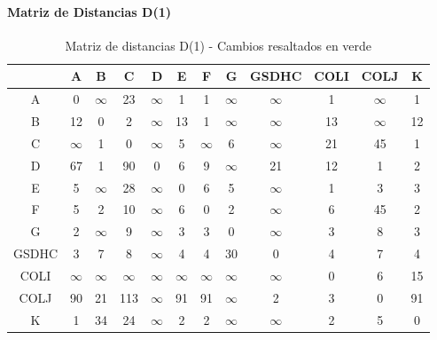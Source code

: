 \documentclass[12pt]{article}
\begin{document}
\paragraph{Matriz de Distancias D(1)}
\begin{table}[h!]
\centering
\begin{tabular}{|c|c|c|c|c|c|c|c|c|c|c|c|}
\hline
 & A & B & C & D & E & F & G & GSDHC & COLI & COLJ & K \\\hline
A & 0 & $\infty$ & 23 & $\infty$ & 1 & 1 & $\infty$ & $\infty$ & 1 & $\infty$ & 1 \\\hline
B & 12 & 0 & 2 & $\infty$ & \cellcolor{lightgreen} 13 & 1 & $\infty$ & $\infty$ & \cellcolor{lightgreen} 13 & $\infty$ & 12 \\\hline
C & $\infty$ & 1 & 0 & $\infty$ & 5 & $\infty$ & 6 & $\infty$ & 21 & 45 & 1 \\\hline
D & 67 & 1 & \cellcolor{lightgreen} 90 & 0 & 6 & 9 & $\infty$ & 21 & 12 & 1 & 2 \\\hline
E & 5 & $\infty$ & \cellcolor{lightgreen} 28 & $\infty$ & 0 & \cellcolor{lightgreen} 6 & 5 & $\infty$ & 1 & 3 & 3 \\\hline
F & 5 & 2 & 10 & $\infty$ & \cellcolor{lightgreen} 6 & 0 & 2 & $\infty$ & \cellcolor{lightgreen} 6 & 45 & 2 \\\hline
G & 2 & $\infty$ & 9 & $\infty$ & \cellcolor{lightgreen} 3 & \cellcolor{lightgreen} 3 & 0 & $\infty$ & \cellcolor{lightgreen} 3 & 8 & \cellcolor{lightgreen} 3 \\\hline
GSDHC & 3 & 7 & 8 & $\infty$ & \cellcolor{lightgreen} 4 & \cellcolor{lightgreen} 4 & 30 & 0 & \cellcolor{lightgreen} 4 & 7 & \cellcolor{lightgreen} 4 \\\hline
COLI & $\infty$ & $\infty$ & $\infty$ & $\infty$ & $\infty$ & $\infty$ & $\infty$ & $\infty$ & 0 & 6 & 15 \\\hline
COLJ & 90 & 21 & \cellcolor{lightgreen} 113 & $\infty$ & \cellcolor{lightgreen} 91 & \cellcolor{lightgreen} 91 & $\infty$ & 2 & 3 & 0 & \cellcolor{lightgreen} 91 \\\hline
K & 1 & 34 & \cellcolor{lightgreen} 24 & $\infty$ & \cellcolor{lightgreen} 2 & \cellcolor{lightgreen} 2 & $\infty$ & $\infty$ & \cellcolor{lightgreen} 2 & 5 & 0 \\\hline
\end{tabular}
\caption{Matriz de distancias D(1) - Cambios resaltados en verde}
\end{table}
\end{document}
